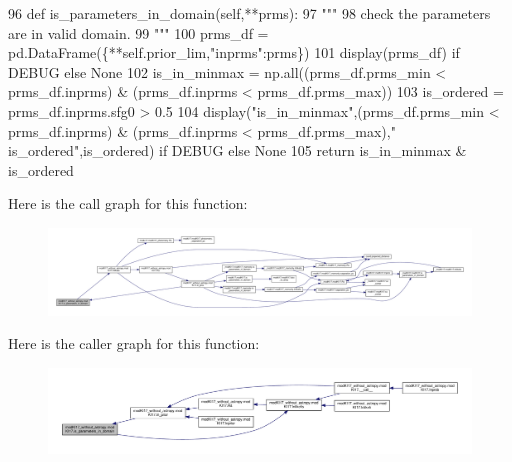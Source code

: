 \begin{DoxyCode}
96     \textcolor{keyword}{def }is\_parameters\_in\_domain(self,**prms):
97         \textcolor{stringliteral}{"""}
98 \textcolor{stringliteral}{        check the parameters are in valid domain.}
99 \textcolor{stringliteral}{        """}
100         prms\_df = pd.DataFrame(\{**self.prior\_lim,\textcolor{stringliteral}{"inprms"}:prms\})
101         display(prms\_df) \textcolor{keywordflow}{if} DEBUG \textcolor{keywordflow}{else} \textcolor{keywordtype}{None}
102         is\_in\_minmax = np.all((prms\_df.prms\_min < prms\_df.inprms) & (prms\_df.inprms < prms\_df.prms\_max))
103         is\_ordered = prms\_df.inprms.sfg0 > 0.5
104         display(\textcolor{stringliteral}{"is\_in\_minmax"},(prms\_df.prms\_min < prms\_df.inprms) & (prms\_df.inprms < prms\_df.prms\_max),\textcolor{stringliteral}{"
      is\_ordered"},is\_ordered) \textcolor{keywordflow}{if} DEBUG \textcolor{keywordflow}{else} \textcolor{keywordtype}{None}
105         \textcolor{keywordflow}{return} is\_in\_minmax & is\_ordered
\end{DoxyCode}
Here is the call graph for this function\+:\nopagebreak
\begin{figure}[H]
\begin{center}
\leavevmode
\includegraphics[width=350pt]{d3/df4/classmodKI17__without__astropy_1_1modKI17_a3902e77a9423d8d874400b1bc6291ef7_cgraph}
\end{center}
\end{figure}
Here is the caller graph for this function\+:\nopagebreak
\begin{figure}[H]
\begin{center}
\leavevmode
\includegraphics[width=350pt]{d3/df4/classmodKI17__without__astropy_1_1modKI17_a3902e77a9423d8d874400b1bc6291ef7_icgraph}
\end{center}
\end{figure}
\mbox{\label{classmodKI17__without__astropy_1_1modKI17_a4ebd2891cdc0426fcb517062f49c19d6}} 
